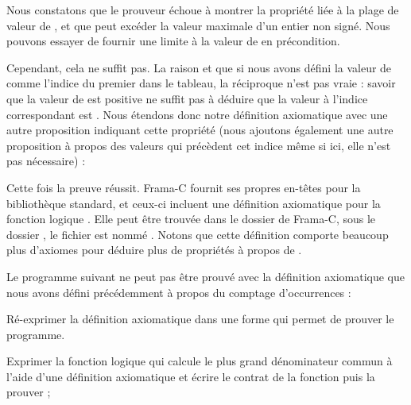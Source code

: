 

Nous constatons que le prouveur échoue à montrer la propriété liée à la
plage de valeur de , et que  peut excéder la
valeur maximale d'un entier non signé. Nous pouvons essayer de fournir une
limite à la valeur de  en précondition.




Cependant, cela ne suffit pas. La raison et que si nous avons défini la
valeur de  comme l'indice du premier
 dans le tableau, la réciproque n'est pas
vraie : savoir que la valeur de  est positive ne suffit
pas à déduire que la valeur à l'indice correspondant est
. Nous étendons donc notre définition
axiomatique avec une autre proposition indiquant cette propriété (nous
ajoutons également une autre proposition à propos des valeurs qui
précèdent cet indice même si ici, elle n'est pas nécessaire) :





Cette fois la preuve réussit. Frama-C fournit ses propres en-têtes pour
la bibliothèque standard, et ceux-ci incluent une définition axiomatique pour
la fonction logique . Elle peut être trouvée dans le
dossier de Frama-C, sous le dossier , le fichier est
nommé . Notons que cette définition
comporte beaucoup plus d'axiomes pour déduire plus de propriétés à propos de
.







Le programme suivant ne peut pas être prouvé avec la définition axiomatique
que nous avons défini précédemment à propos du comptage d'occurrences :




Ré-exprimer la définition axiomatique dans une forme qui permet de prouver le
programme.







Exprimer la fonction logique qui calcule le plus grand dénominateur commun à l'aide
d'une définition axiomatique et écrire le contrat de la fonction 
puis la prouver ;



